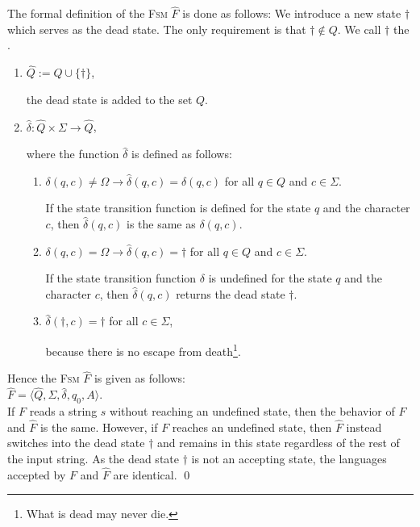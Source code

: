 The formal definition of the \textsc{Fsm} $\widehat{F}$ is done as follows:
We introduce a new state $\dag$ which serves as the dead state.  The only requirement is that $\dag \not\in Q$.  We call $\dag$ the
.
\begin{enumerate}
\item $\widehat{Q} := Q \cup \{ \dag \}$,

      the dead state is added to the set  $Q$.
\item $\widehat{\delta} : \widehat{Q} \times \Sigma \rightarrow \widehat{Q}$,

      where the function $\widehat{\delta}$ is defined as follows:
      \begin{enumerate}
      \item $\delta(q,c) \not= \Omega \rightarrow \widehat{\delta}(q,c) = \delta(q,c)$ for all $q \in Q$ and $c \in \Sigma$.

            If the state transition function is defined for the state  $q$ and the character
            $c$, then $\widehat{\delta}(q,c)$ is the same as $\delta(q,c)$.
      \item $\delta(q,c) = \Omega \rightarrow \widehat{\delta}(q,c) = \dag$  for all $q \in Q$ and $c \in \Sigma$.

            If the state transition function $\delta$ is undefined for the state $q$ and the character
            $c$, then $\widehat{\delta}(q,c)$ returns the dead state $\dag$.
      \item $\widehat{\delta}(\dag, c) = \dag$ \quad for all $c \in \Sigma$,

            because there is no escape from death\footnote{What is dead may never die.}.
      \end{enumerate}
\end{enumerate}
Hence the \textsc{Fsm}  $\widehat{F}$ is given as follows:
\\[0.2cm]
\hspace*{1.3cm}
$\widehat{F} = \langle \widehat{Q}, \Sigma, \widehat{\delta}, q_0, A \rangle$.
\\[0.2cm]
If  $F$ reads a string $s$ without reaching an undefined state, then the behavior of $F$ and $\widehat{F}$ is the same.
However, if $F$ reaches an undefined state, then $\widehat{F}$ instead switches into the dead state 
$\dag$ and remains in this state regardless of the rest of the input string.  As the dead state $\dag$
is not an accepting state, the languages accepted by  $F$ and $\widehat{F}$ are identical. \qed 

